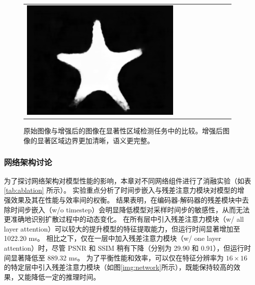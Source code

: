\begin{figure}[ht]
\begin{center}
\begin{tabular}{ccccccccc}
            \includegraphics[width = 0.10\linewidth, height=0.10\linewidth]{figures/ch3/compare/discussion/SOD/sod/9.png}  \\
		\end{tabular}
	\end{center}
	\caption{\label{img:sod}原始图像与增强后的图像在显著性区域检测任务中的比较。增强后图像的显著区域边界更加清晰，语义更完整。}
	\vspace{-2mm}
\end{figure}     %

\subsubsection{网络架构讨论}
为了探讨网络架构对模型性能的影响，本章对不同网络组件进行了消融实验（如表 \ref{tab:ablation} 所示）。
实验重点分析了时间步嵌入与残差注意力模块对模型的增强效果及其在性能与效率间的权衡。
结果表明，在编码器-解码器的残差模块中去除时间步嵌入（w/o timestep）会明显降低模型对采样时间步的敏感性，从而无法更准确地识别扩散过程中的动态变化。
在所有层中引入残差注意力模块（w/ all layer attention）可以较大的提升模型的特征提取能力，但运行时间显著增加至 1022.20 ms。
相比之下，仅在一层中加入残差注意力模块（w/ one layer attention）时，尽管 PSNR 和 SSIM 稍有下降（分别为 29.90 和 0.91），但运行时间显著降低至 889.32 ms。
为了平衡性能和效率，可以仅在特征分辨率为 $16 \times 16$ 的特定层中引入残差注意力模块（如图\ref{img:network}所示），既能保持较高的效果，又能降低一定的推理时间。
\begin{table}[ht]
    \vspace{-0.4mm}
    \centering
    \caption{\label{tab:ablation}消融实验结果。}
    \vspace{1mm}
\end{table}

